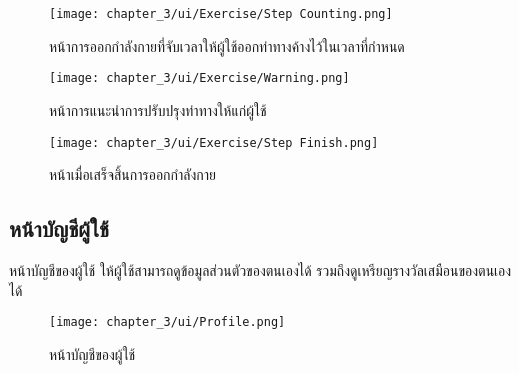 \begin{figure}
    \texttt{[image: chapter\_3/ui/Exercise/Step Counting.png]}
    \caption{หน้าการออกกำลังกายที่จับเวลาให้ผู้ใช้ออกท่าทางค้างไว้ในเวลาที่กำหนด}
\end{figure}

\begin{figure}
    \texttt{[image: chapter\_3/ui/Exercise/Warning.png]}
    \caption{หน้าการแนะนำการปรับปรุงท่าทางให้แก่ผู้ใช้}
\end{figure}

\begin{figure}
    \texttt{[image: chapter\_3/ui/Exercise/Step Finish.png]}
    \caption{หน้าเมื่อเสร็จสิ้นการออกกำลังกาย}
\end{figure}

\subsection{หน้าบัญชีผู้ใช้}
หน้าบัญชีของผู้ใช้ ให้ผู้ใช้สามารถดูข้อมูลส่วนตัวของตนเองได้ รวมถึงดูเหรียญรางวัลเสมือนของตนเองได้

\begin{figure}
    \texttt{[image: chapter\_3/ui/Profile.png]}
    \caption{หน้าบัญชีของผู้ใช้}
\end{figure}


\clearpage